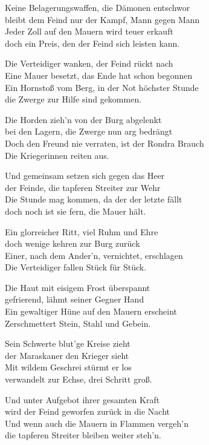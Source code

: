 Keine Belagerungswaffen, die Dämonen entschwor\\
bleibt dem Feind nur der Kampf, Mann gegen Mann\\
Jeder Zoll auf den Mauern wird teuer erkauft\\
doch ein Preis, den der Feind sich leisten kann.

Die Verteidiger wanken, der Feind rückt nach\\
Eine Mauer besetzt, das Ende hat schon begonnen\\
Ein Hornstoß vom Berg, in der Not höchster Stunde\\
die Zwerge zur Hilfe sind gekommen.

Die Horden zieh'n von der Burg abgelenkt\\
bei den Lagern, die Zwerge nun arg bedrängt\\
Doch den Freund nie verraten, ist der Rondra Brauch\\
Die Kriegerinnen reiten aus.

Und gemeinsam setzen sich gegen das Heer\\
der Feinde, die tapferen Streiter zur Wehr\\
Die Stunde mag kommen, da der der letzte fällt\\
doch noch ist sie fern, die Mauer hält.

Ein glorreicher Ritt, viel Ruhm und Ehre\\
doch wenige kehren zur Burg zurück\\
Einer, nach dem Ander'n, vernichtet, erschlagen\\
Die Verteidiger fallen Stück für Stück.

Die Haut mit eisigem Frost überspannt\\
gefrierend, lähmt seiner Gegner Hand\\
Ein gewaltiger Hüne auf den Mauern erscheint\\
Zerschmettert Stein, Stahl und Gebein.

Sein Schwerte blut'ge Kreise zieht\\
der Maraskaner den Krieger sieht\\
Mit wildem Geschrei stürmt er los\\
verwandelt zur Echse, drei Schritt groß.

Und unter Aufgebot ihrer gesamten Kraft\\
wird der Feind geworfen zurück in die Nacht\\
Und wenn auch die Mauern in Flammen vergeh'n\\
die tapferen Streiter bleiben weiter steh'n.

